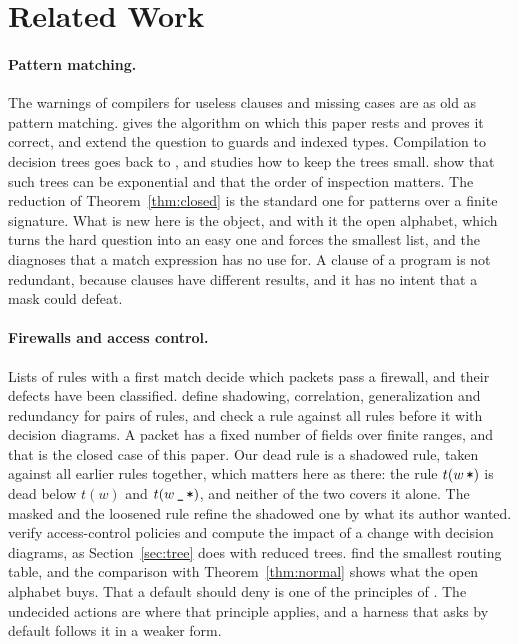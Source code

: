\documentclass[acmsmall,nonacm,screen]{acmart}
\newcommand{\any}{\textup{\texttt{\_}}}
\newcommand{\rest}{\textup{\texttt{*}}}
\begin{document}
\section{Related Work}\label{sec:related}

\paragraph{Pattern matching.} The warnings of compilers for useless clauses and missing cases
are as old as pattern matching. \citet{Maranget2007} gives the algorithm on which this paper
rests and proves it correct, and \citet{Karachalias2015} extend the question to guards and
indexed types. Compilation to decision trees goes back to \citet{Augustsson1985}, and
\citet{Maranget2008} studies how to keep the trees small. \citet{Sekar1995} show that such
trees can be exponential and that the order of inspection matters. The reduction of
Theorem~\ref{thm:closed} is the standard one for patterns over a finite signature. What is
new here is the object, and with it the open alphabet, which turns the hard question into an
easy one and forces the smallest list, and the diagnoses that a match expression has no use
for. A clause of a program is not redundant, because clauses have different results, and it
has no intent that a mask could defeat.

\paragraph{Firewalls and access control.} Lists of rules with a first match decide which
packets pass a firewall, and their defects have been classified. \citet{AlShaer2004} define
shadowing, correlation, generalization and redundancy for pairs of rules, and
\citet{Yuan2006} check a rule against all rules before it with decision diagrams. A packet
has a fixed number of fields over finite ranges, and that is the closed case of this paper.
Our dead rule is a shadowed rule, taken against all earlier rules together, which matters
here as there: the rule $t(w\,\rest)$ is dead below $t(w)$ and $t(w\,\any\,\rest)$, and
neither of the two covers it alone. The masked and the loosened rule refine the shadowed one
by what its author wanted. \citet{Fisler2005} verify access-control policies and compute the
impact of a change with decision diagrams, as Section~\ref{sec:tree} does with reduced trees.
\citet{Draves1999} find the smallest routing table, and the comparison with
Theorem~\ref{thm:normal} shows what the open alphabet buys. That a default should deny is one
of the principles of \citet{Saltzer1975}. The undecided actions are where that principle
applies, and a harness that asks by default follows it in a weaker form.
\end{document}
